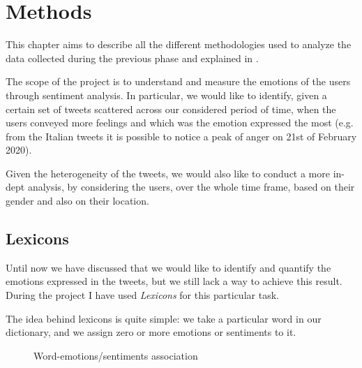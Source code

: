 \graphicspath{{chapters/chapter3/img/}}

\chapter{Methods}
\label{cha:methods}

This chapter aims to describe all the different methodologies used to analyze the data collected during the previous phase and explained in . 

The scope of the project is to understand and measure the emotions of the users through sentiment analysis. In particular, we would like to identify, given a certain set of tweets scattered across our considered period of time, when the users conveyed more feelings and which was the emotion expressed the most (e.g. from the Italian tweets it is possible to notice a peak of anger on 21st of February 2020).

Given the heterogeneity of the tweets, we would also like to conduct a more in-dept analysis, by considering the users, over the whole time frame, based on their gender and also on their location.

\section{Lexicons}
\label{lexicons}

Until now we have discussed that we would like to identify and quantify the emotions expressed in the tweets, but we still lack a way to achieve this result. During the project I have used \textit{Lexicons} for this particular task.

The idea behind lexicons is quite simple: we take a particular word in our dictionary, and we assign zero or more emotions or sentiments to it.
\begin{figure}[H]
	\centering
	\caption{Word-emotions/sentiments association}
	\label{fig:word-association}
\end{figure}


